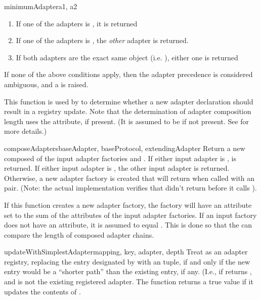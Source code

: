 \begin{verbatim%
}
\begin{verbatim%
}
\begin{verbatim%
}
\begin{verbatim%
}
\begin{funcdesc}{minimumAdapter}{a1, a2 }
\begin{enumerate}
\item If one of the adapters is , it is returned
\item If one of the adapters is , the \emph{other}
adapter is returned.
\item If both adapters are the exact same object (i.e. ), either
one is returned
\end{enumerate}

If none of the above conditions apply, then the adapter precedence is
considered ambiguous, and a  is raised.

This function is used by  to determine
whether a new adapter declaration should result in a registry update.  Note
that the determination of adapter composition length uses the
 attribute, if present.  (It is assumed to be
 if not present.  See  for more
details.)
\end{funcdesc}


\begin{funcdesc}{composeAdapters}{baseAdapter, baseProtocol, extendingAdapter}
Return a new  composed of the input adapter factories
 and .  If either input adapter is
,  is returned.  If
either input adapter is , the other input adapter
is returned.  Otherwise, a new adapter factory is created that will return
when called with an  pair.  (Note: the actual
implementation verifies that  didn't return 
before it calls ).

If this function creates a new adapter factory, the factory will have an
 attribute set to the sum of the
 attributes of the input adapter factories.  If an
input factory does not have an  attribute, it is
assumed to equal .  This is done so that the
 can compare the length of composed adapter chains.
\end{funcdesc}


\begin{funcdesc}{updateWithSimplestAdapter}{mapping, key, adapter, depth}
Treat  as an adapter registry, replacing the entry designated by
 with an  tuple, if and only if
the new entry would be a ``shorter path'' than the existing entry, if any.
(I.e., if 
returns , and  is not the existing registered
adapter.  The function returns a true value if it updates the contents of
.


\end{funcdesc}
\end{verbatim%
}
\end{verbatim%
}
\end{verbatim%
}
\end{verbatim%
}
